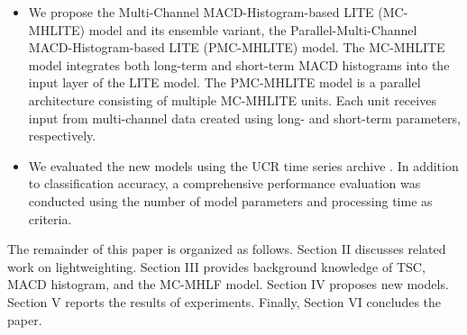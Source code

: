 \documentclass[conference]{IEEEtran}
\begin{document}
\begin{itemize}
\item We propose the Multi-Channel MACD-Histogram-based LITE (MC-MHLITE) model and its ensemble variant, the Parallel-Multi-Channel MACD-Histogram-based LITE (PMC-MHLITE) model. The MC-MHLITE model integrates both long-term and short-term MACD histograms into the input layer of the LITE model. The PMC-MHLITE model is a parallel architecture consisting of multiple MC-MHLITE units. Each unit receives input from multi-channel data created using long- and short-term parameters, respectively.

\item We evaluated the new models using the UCR time series archive \cite{8894743}. In addition to classification accuracy, a comprehensive performance evaluation was conducted using the number of model parameters and processing time as criteria.
\end{itemize}

The remainder of this paper is organized as follows. Section II discusses related work on lightweighting. Section III provides background knowledge of TSC, MACD histogram, and the MC-MHLF model. Section IV proposes new models. Section V reports the results of experiments. Finally, Section VI concludes the paper.
\end{document}
